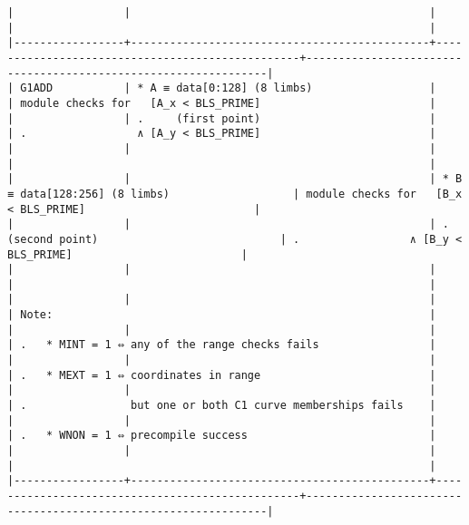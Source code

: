 \documentclass[varwidth=\maxdimen,margin=0.5cm,multi={verbatim}]{standalone}
\begin{document}
\begin{verbatim}
|                 |                                              |                                                 |                                                                |
|-----------------+----------------------------------------------+-------------------------------------------------+----------------------------------------------------------------|
| G1ADD           | * A ≡ data[0:128] (8 limbs)                  |                                                 | module checks for   [A_x < BLS_PRIME]                          |
|                 | .     (first point)                          |                                                 | .                 ∧ [A_y < BLS_PRIME]                          |
|                 |                                              |                                                 |                                                                |
|                 |                                              | * B ≡ data[128:256] (8 limbs)                   | module checks for   [B_x < BLS_PRIME]                          |
|                 |                                              | .     (second point)                            | .                 ∧ [B_y < BLS_PRIME]                          |
|                 |                                              |                                                 |                                                                |
|                 |                                              |                                                 | Note:                                                          |
|                 |                                              |                                                 | .   * MINT = 1 ⇔ any of the range checks fails                 |
|                 |                                              |                                                 | .   * MEXT = 1 ⇔ coordinates in range                          |
|                 |                                              |                                                 | .                but one or both C1 curve memberships fails    |
|                 |                                              |                                                 | .   * WNON = 1 ⇔ precompile success                            |
|                 |                                              |                                                 |                                                                |
|-----------------+----------------------------------------------+-------------------------------------------------+----------------------------------------------------------------|

\end{verbatim}
\end{document}
